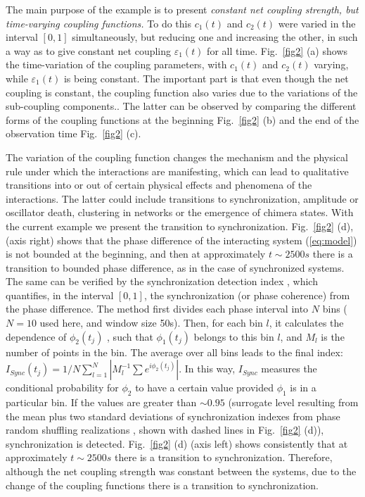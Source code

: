 \documentclass[pre,aps,twocolumn,showpacs]{revtex4}
\newcommand{\red}[1]{{\color{red}{#1}}}
\begin{document}
The main purpose of the example is to present \emph{constant net coupling strength, but time-varying coupling functions.} To do this $c_1(t)$ and $c_2(t)$ were varied in the interval $[0,1]$ simultaneously, but reducing one and increasing the other, in such a way as to give constant net coupling $\varepsilon_1(t)$ for all time. Fig.\ \ref{fig2} (a) shows the time-variation of the coupling parameters, with  $c_1(t)$ and $c_2(t)$ varying, while  $\varepsilon_1(t)$ is being constant. The important part is that even though the net coupling is constant, the coupling function also varies due to the variations of the sub-coupling components.. The latter can be observed by comparing the different forms of the coupling functions at the beginning Fig.\ \ref{fig2} (b) and the end of the observation time Fig.\ \ref{fig2} (c).

The variation of the coupling function changes the mechanism and the physical rule under which the interactions are manifesting, which can lead to qualitative transitions into or out of certain physical effects and phenomena of the interactions. The latter could include transitions to synchronization, amplitude or oscillator death, clustering in networks or the emergence of chimera states. With the current example we present the transition to synchronization. Fig.\ \ref{fig2} (d),(axis right) shows that the phase difference of the interacting system (\ref{eq:model}) is not bounded at the beginning, and then at approximately $t\sim2500s$ there is a transition to bounded phase difference, as in the case of synchronized systems. The same can be verified by the synchronization detection index \cite{Tass:98}, which quantifies, in the interval $[0,1]$, the synchronization (or phase coherence) from the phase difference. The method first divides each phase interval into $N$ bins ($N=10$ used here, and window size 50s). Then, for each bin $l$, it calculates the dependence of $\phi_2(t_j)$ \red{on $\phi_1(t_j)$}, such that $\phi_1(t_j)$ belongs to this bin $l$, and $M_l$ is the number of points in the bin. The average over all bins leads to the final index:
$
I_{Sync}(t_j)=1/N\sum_{l=1}^N |M^{-1}_l\sum e^{i \phi_2(t_j)}|.
$
In this way, $I_{Sync}$ measures the conditional probability for $\phi_2$ to have a certain value provided $\phi_1$ is in a particular bin. If the values are greater than $\sim0.95$ (surrogate level resulting from the mean plus two standard deviations of synchronization indexes from phase random shuffling realizations \cite{Schreiber:00b,Stankovski:14c}, shown with dashed lines in Fig.\ \ref{fig2} (d)), synchronization is detected. Fig.\ \ref{fig2} (d) (axis left) shows consistently that at approximately $t\sim2500s$ there is a transition to synchronization. Therefore, although the net coupling strength was constant between the systems, due to the change of the coupling functions there is a transition to synchronization.
\end{document}
